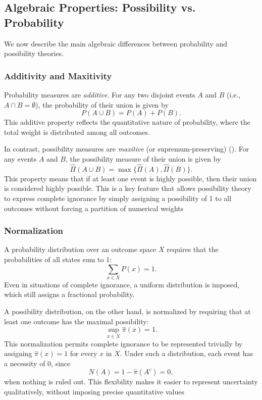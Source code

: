 \documentclass[12pt,a4paper]{report}
\begin{document}
\subsection{Algebraic Properties: Possibility vs. Probability}

We now describe the main algebraic differences between probability and possibility theories.

\subsubsection{Additivity and Maxitivity}

  Probability measures are \emph{additive}. For any two disjoint events \(A\) and \(B\) (i.e., \(A\cap B=\emptyset\)), the probability of their union is given by
  \[
  P(A \cup B) = P(A) + P(B).
  \]
  This additive property reflects the quantitative nature of probability, where the total weight is distributed among all outcomes.

  In contrast, possibility measures are \emph{maxitive} (or supremum-preserving) (\cite{Dubois:2007}). For any events \(A\) and \(B\), the possibility measure of their union is given by
  \[
    \hat{\Pi}(A \cup B) = \max\{\hat{\Pi}(A), \hat{\Pi}(B)\}.
  \]
  This property means that if at least one event is highly possible, then their union is considered highly possible. This is a key feature that allows possibility theory to express complete ignorance by simply assigning a possibility of 1 to all outcomes without forcing a partition of numerical weights 

\subsubsection{Normalization}
  A probability distribution over an outcome space \(X\) requires that the probabilities of all states sum to 1:
  \[
  \sum_{x \in X} P(x) = 1.
  \]
  Even in situations of complete ignorance, a uniform distribution is imposed, which still assigns a fractional probability.

  A possibility distribution, on the other hand, is normalized by requiring that at least one outcome has the maximal possibility:
  \[
    \sup_{x \in X} \hat{\pi}(x) = 1.
  \]
  This normalization permits complete ignorance to be represented trivially by assigning \( \hat{\pi}(x)=1 \) for every \(x\) in \(X\). Under such a distribution, each event has a necessity of 0, since
  \[
  N(A) = 1 - \hat{\pi}(A^c) = 0,
  \]
  when nothing is ruled out. This flexibility makes it easier to represent uncertainty qualitatively, without imposing precise quantitative values 
\end{document}
